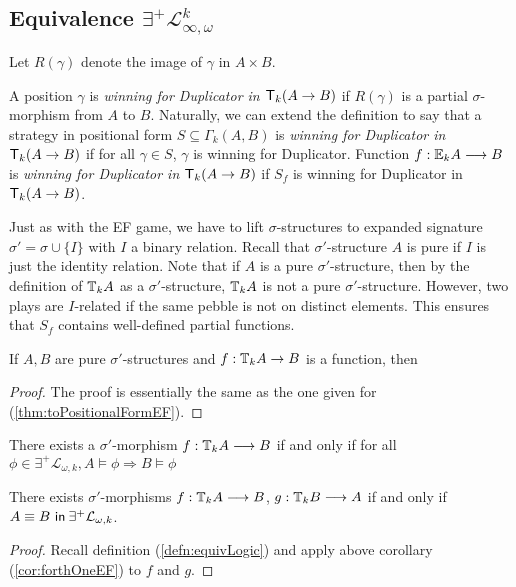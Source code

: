 \subsection{Equivalence $\exists^{+}\mathcal{L}^{k}_{\infty,\omega}$}
Let $R(\gamma)$ denote the image of $\gamma$ in $A \times B$.
\begin{defn}
A position $\gamma$ is \textit{winning for Duplicator in ${\mathsf{T}_{k}(A \rightarrow B)}$} if $R(\gamma)$ is a partial $\sigma$-morphism from $A$ to $B$.  
Naturally, we can extend the definition to say that a strategy in positional form $S \subseteq \Gamma_{k}(A,B)$ is \textit{winning for Duplicator in ${\mathsf{T}_{k}(A \rightarrow B)}$} if for all $\gamma \in S$, $\gamma$ is winning for Duplicator. Function $f:{\mathbb{E}_{k}A} \longrightarrow B$ is \textit{winning for Duplicator in ${\mathsf{T}_{k}(A \rightarrow B)}$} if $S_{f}$ is winning for Duplicator in ${\mathsf{T}_{k}(A \rightarrow B)}$.
\end{defn}
Just as with the EF game, we have to lift $\sigma$-structures to expanded signature $\sigma' = \sigma \cup \{I\}$ with $I$ a binary relation. Recall that $\sigma'$-structure $A$ is pure if $I$ is just the identity relation. Note that if $A$ is a pure $\sigma'$-structure, then by the definition of ${\mathbb{T}_{k}A}$ as a $\sigma'$-structure, ${\mathbb{T}_{k}A}$ is not a pure $\sigma'$-structure. However, two plays are $I$-related if the same pebble is not on distinct elements. This ensures that $S_{f}$ contains well-defined partial functions.
\begin{thm}
If $A,B$ are pure $\sigma'$-structures and $f:{\mathbb{T}_{k}A} \rightarrow B$ is a function, then
\begin{proof}
The proof is essentially the same as the one given for (\ref{thm:toPositionalFormEF}). 
\end{proof}
\begin{cor}[]
There exists a $\sigma'$-morphism $f:{\mathbb{T}_{k}A} \longrightarrow B$ if and only if for all $\phi \in \exists^{+}\mathcal{L}_{\omega,k}, A \vDash \phi \Rightarrow B \vDash \phi$
\label{cor:forthOneP}
\end{cor}
\begin{cor}
There exists $\sigma'$-morphisms $f:{\mathbb{T}_{k}A} \longrightarrow B$, $g:{\mathbb{T}_{k}B} \longrightarrow A$ if and only if ${A \equiv B \ \mathsf{in}\: \exists^{+}\mathcal{L}_{\omega,k}}$. 
\begin{proof}
Recall definition (\ref{defn:equivLogic}) and apply above corollary (\ref{cor:forthOneEF}) to $f$ and $g$.  
\end{proof}
\label{cor:forthP}
\end{cor}
\label{thm:toPositionalFormP}
\end{thm}
